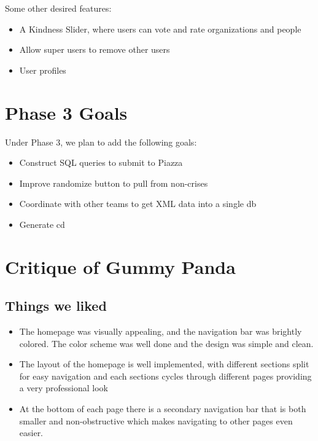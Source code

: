 \documentclass[12pt]{report}
\begin{document}
\hfill \newline
Some other desired features:
\begin{itemize}
\item A Kindness Slider, where users can vote and rate organizations and people
\item Allow super users to remove other users
\item User profiles
\end{itemize}


\newpage
\section*{Phase 3 Goals}
\hfill

Under Phase 3, we plan to add the following goals:
\begin{itemize}
\item Construct SQL queries to submit to Piazza
\item Improve randomize button to pull from non-crises
\item Coordinate with other teams to get XML data into a single db
\item Generate cd
\end{itemize}

\newpage
\section*{Critique of Gummy Panda}
\hfill

\subsection*{Things we liked}
\hfill \newline

\begin{itemize}
\item The homepage was visually appealing, and the navigation bar was brightly colored. The color scheme was well done and the design was simple and clean.
\item The layout of the homepage is well implemented, with different sections split for easy navigation and each sections cycles through different pages providing a very professional look
\item At the bottom of each page there is a secondary navigation bar that is both smaller and non-obstructive which makes navigating to other pages even easier.
\end{itemize}
\end{document}
